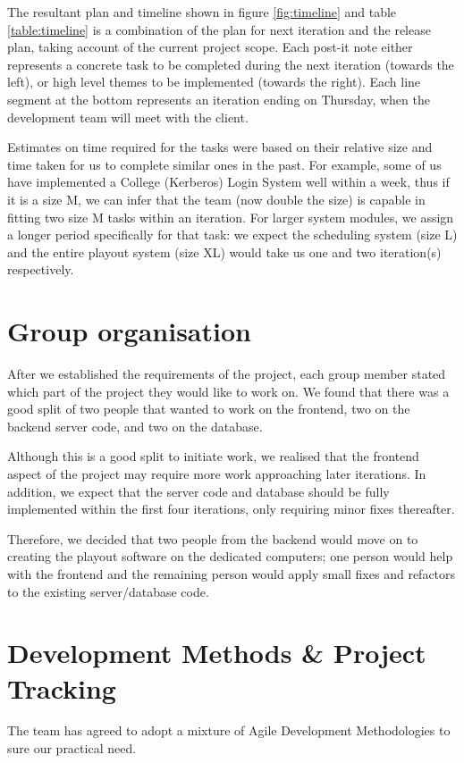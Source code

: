 \documentclass[a4paper]{article}
\begin{document}
The resultant plan and timeline shown in figure \ref{fig:timeline} and table
\ref{table:timeline} is a
combination of the plan for next iteration and the release plan, taking account
of the current project scope. Each post-it note either represents a 
concrete task to be completed during the next iteration (towards the left), or
high level themes to be implemented (towards the right). Each line segment at
the bottom represents an iteration ending on Thursday, when the development
team will meet with the client.

Estimates on time required for the tasks were based on their relative size and
time taken for us to complete similar ones in the past. For example, some of us
have implemented a College (Kerberos) Login System well within a week, thus if
it is a size M, we can infer that the team (now double the size) is capable in 
fitting two size M tasks within an iteration. For larger system modules, we
assign a longer period specifically for that task: we expect the scheduling
system (size L) and the entire playout system (size XL) would take us one and
two iteration(s) respectively.


\section{Group organisation} \label{sec:group}
After we established the requirements of the project, each group member stated
which part of the project they would like to work on. We found that there was a
good split of two people that wanted to work on the frontend, two on the backend
server code, and two on the database.

Although this is a good split to initiate work, we realised that the frontend 
aspect of the project may require more work approaching later iterations.
In addition, we  expect that the server code and database should be fully 
implemented within the first four iterations, only requiring minor fixes thereafter.

Therefore, we decided that two people from the backend would move on to creating
the playout software on the dedicated computers; one person would help with the
frontend and the remaining person would apply small fixes and refactors to the
existing server/database code. 


\section{Development Methods \& Project Tracking}
The team has agreed to adopt a mixture of Agile Development Methodologies to
sure our practical need.
\end{document}

